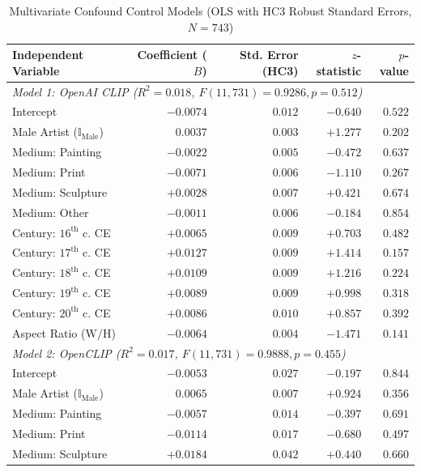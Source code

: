 \documentclass[pdflatex,sn-mathphys-num]{sn-jnl}%
\theoremstyle{thmstyleone}%
\theoremstyle{thmstyletwo}%
\theoremstyle{thmstylethree}%
\begin{document}
\begin{table}[h]
\caption{Multivariate Confound Control Models (OLS with HC3 Robust Standard Errors, $N=743$)}
\label{tab:ols_results_expanded}
\centering
\small
\begin{tabular}{lrrrr}
\toprule
\textbf{Independent Variable} & \textbf{Coefficient ($B$)} & \textbf{Std. Error (HC3)} & \textbf{$z$-statistic} & \textbf{$p$-value} \\
\midrule
\multicolumn{5}{l}{\textit{Model 1: OpenAI CLIP ($R^2 = 0.018$, $F(11, 731) = 0.9286, p = 0.512$)}} \\
Intercept & $-0.0074$ & $0.012$ & $-0.640$ & $0.522$ \\
Male Artist ($\mathbb{I}_{\text{Male}}$) & $0.0037$ & $0.003$ & $+1.277$ & $0.202$ \\
Medium: Painting & $-0.0022$ & $0.005$ & $-0.472$ & $0.637$ \\
Medium: Print & $-0.0071$ & $0.006$ & $-1.110$ & $0.267$ \\
Medium: Sculpture & $+0.0028$ & $0.007$ & $+0.421$ & $0.674$ \\
Medium: Other & $-0.0011$ & $0.006$ & $-0.184$ & $0.854$ \\
Century: $16^{\text{th}}$ c. CE & $+0.0065$ & $0.009$ & $+0.703$ & $0.482$ \\
Century: $17^{\text{th}}$ c. CE & $+0.0127$ & $0.009$ & $+1.414$ & $0.157$ \\
Century: $18^{\text{th}}$ c. CE & $+0.0109$ & $0.009$ & $+1.216$ & $0.224$ \\
Century: $19^{\text{th}}$ c. CE & $+0.0089$ & $0.009$ & $+0.998$ & $0.318$ \\
Century: $20^{\text{th}}$ c. CE & $+0.0086$ & $0.010$ & $+0.857$ & $0.392$ \\
Aspect Ratio ($\text{W}/\text{H}$) & $-0.0064$ & $0.004$ & $-1.471$ & $0.141$ \\
\midrule
\multicolumn{5}{l}{\textit{Model 2: OpenCLIP ($R^2 = 0.017$, $F(11, 731) = 0.9888, p = 0.455$)}} \\
Intercept & $-0.0053$ & $0.027$ & $-0.197$ & $0.844$ \\
Male Artist ($\mathbb{I}_{\text{Male}}$) & $0.0065$ & $0.007$ & $+0.924$ & $0.356$ \\
Medium: Painting & $-0.0057$ & $0.014$ & $-0.397$ & $0.691$ \\
Medium: Print & $-0.0114$ & $0.017$ & $-0.680$ & $0.497$ \\
Medium: Sculpture & $+0.0184$ & $0.042$ & $+0.440$ & $0.660$ \\

\end{tabular}
\end{table}
\end{document}

